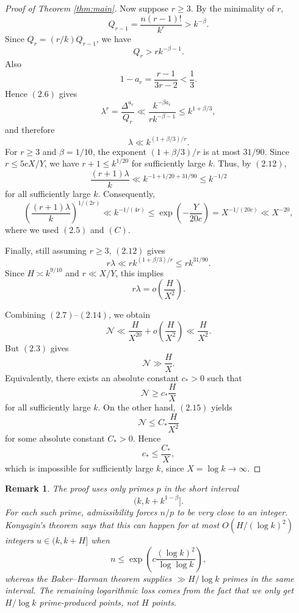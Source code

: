 \documentclass[11pt]{article}
\newtheorem{remark}{Remark}
\begin{document}
\begin{proof}[Proof of Theorem \ref{thm:main}]
Now suppose \(r\ge3\). By the minimality of \(r\),
\[
        Q_{r-1}=\frac{n(r-1)!}{k^r}>k^{-\beta}.
\]
Since \(Q_r=(r/k)Q_{r-1}\), we have
\[
        Q_r>r k^{-\beta-1}.
\]
Also
\[
        1-a_r=\frac{r-1}{3r-2}<\frac13 .
\]
Hence \((2.6)\) gives
\[
        \lambda^r
        =
        \frac{\Delta^{a_r}}{Q_r}
        \ll
        \frac{k^{-\beta a_r}}{r k^{-\beta-1}}
        \le
        k^{1+\beta/3},
\]
and therefore
\[
        \lambda\ll k^{(1+\beta/3)/r} .
        \tag{2.12}
\]
For \(r\ge3\) and \(\beta=1/10\), the exponent \((1+\beta/3)/r\) is at most
\(31/90\). Since \(r\le5cX/Y\), we have \(r+1\le k^{1/20}\) for sufficiently
large \(k\). Thus, by \((2.12)\),
\[
        \frac{(r+1)\lambda}{k}
        \ll
        k^{-1+1/20+31/90}
        \le
        k^{-1/2}
\]
for all sufficiently large \(k\). Consequently,
\[
        \left(\frac{(r+1)\lambda}{k}\right)^{1/(2r)}
        \ll
        k^{-1/(4r)}
        \le
        \exp\!\left(-\frac{Y}{20c}\right)
        =
        X^{-1/(20c)}
        \ll
        X^{-20},
        \tag{2.13}
\]
where we used \((2.5)\) and \((C)\).

Finally, still assuming \(r\ge3\), \((2.12)\) gives
\[
        r\lambda
        \ll
        r k^{(1+\beta/3)/r}
        \le
        r k^{31/90}.
\]
Since \(H\asymp k^{9/10}\) and \(r\ll X/Y\), this implies
\[
        r\lambda
        =
        o\!\left(\frac{H}{X^2}\right).
        \tag{2.14}
\]

Combining \((2.7)\)--\((2.14)\), we obtain
\[
        \mathcal N
        \ll
        \frac{H}{X^{20}}
        +
        o\!\left(\frac{H}{X^2}\right)
        \ll
        \frac{H}{X^2}.
        \tag{2.15}
\]
But \((2.3)\) gives
\[
    \mathcal N\gg \frac{H}{X}.
\]
Equivalently, there exists an absolute constant \(c_*>0\) such that
\[
    \mathcal N\ge c_*\frac{H}{X}
\]
for all sufficiently large \(k\). On the other hand, \((2.15)\) yields
\[
    \mathcal N\le C_*\frac{H}{X^2}
\]
for some absolute constant \(C_*>0\). Hence
\[
    c_*\le \frac{C_*}{X},
\]
which is impossible for sufficiently large \(k\), since \(X=\log k\to\infty\).
\end{proof}

\begin{remark}
The proof uses only primes \(p\) in the short interval
\[
        (k,k+k^{1-\beta}] .
\]
For each such prime, admissibility forces \(n/p\) to be very close to an
integer. Konyagin's theorem says that this can happen for at most
\(O(H/(\log k)^2)\) integers \(u\in(k,k+H]\) when
\[
        n\le
        \exp\!\left(c\frac{(\log k)^2}{\log\log k}\right),
\]
whereas the Baker--Harman theorem supplies \(\gg H/\log k\) primes in the same
interval. The remaining logarithmic loss comes from the fact that we only get
\(H/\log k\) prime-produced points, not \(H\) points.
\end{remark}
\end{document}
